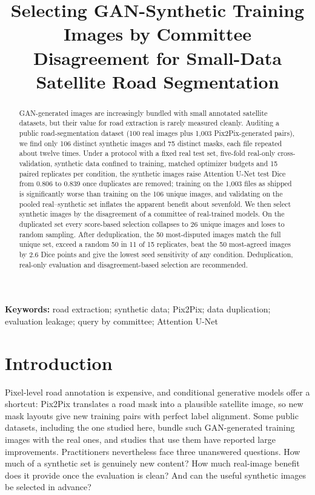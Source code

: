 \documentclass[11pt]{article}
\title{Selecting GAN-Synthetic Training Images by Committee Disagreement for Small-Data Satellite Road Segmentation}
\author{\authorblock}
\date{}
\begin{document}
\maketitle

\begin{abstract}
GAN-generated images are increasingly bundled with small annotated satellite datasets, but their value for road extraction is rarely measured cleanly. Auditing a public road-segmentation dataset (100 real images plus 1{,}003 Pix2Pix-generated pairs), we find only 106 distinct synthetic images and 75 distinct masks, each file repeated about twelve times. Under a protocol with a fixed real test set, five-fold real-only cross-validation, synthetic data confined to training, matched optimizer budgets and 15 paired replicates per condition, the synthetic images raise Attention U-Net test Dice from 0.806 to 0.839 once duplicates are removed; training on the 1{,}003 files as shipped is significantly worse than training on the 106 unique images, and validating on the pooled real--synthetic set inflates the apparent benefit about sevenfold. We then select synthetic images by the disagreement of a committee of real-trained models. On the duplicated set every score-based selection collapses to 26 unique images and loses to random sampling. After deduplication, the 50 most-disputed images match the full unique set, exceed a random 50 in 11 of 15 replicates, beat the 50 most-agreed images by 2.6 Dice points and give the lowest seed sensitivity of any condition. Deduplication, real-only evaluation and disagreement-based selection are recommended.
\end{abstract}

\noindent\textbf{Keywords:} road extraction; synthetic data; Pix2Pix; data duplication; evaluation leakage; query by committee; Attention U-Net

\section{Introduction}

Pixel-level road annotation is expensive, and conditional generative models offer a shortcut: Pix2Pix \citep{isola2017} translates a road mask into a plausible satellite image, so new mask layouts give new training pairs with perfect label alignment. Some public datasets, including the one studied here, bundle such GAN-generated training images with the real ones, and studies that use them have reported large improvements. Practitioners nevertheless face three unanswered questions. How much of a synthetic set is genuinely new content? How much real-image benefit does it provide once the evaluation is clean? And can the useful synthetic images be selected in advance?
\end{document}
